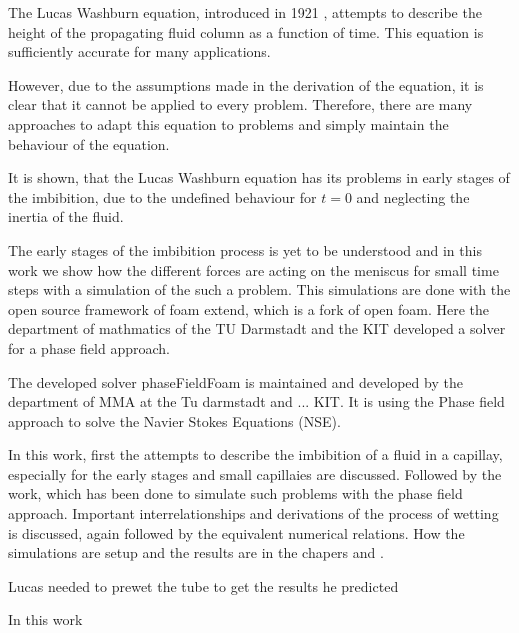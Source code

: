 The Lucas Washburn equation, introduced in 1921 \cite{lucas_ueber_1918, washburn_dynamics_1921}, attempts to describe the height of the propagating fluid column as a function of time. This equation is sufficiently accurate for many applications.   
  
However, due to the assumptions made in the derivation of the equation, it is clear that it cannot be applied to every problem. Therefore, there are many approaches to adapt this equation to problems and simply maintain the behaviour of the equation. 

It is shown, that the Lucas Washburn equation has its problems in early stages of the imbibition\cite{bosanquet_lv_1923, quere_inertial_1997}, due to the undefined behaviour for $t=0$ and neglecting the inertia of the fluid. 

The early stages of the imbibition process is yet to be understood and in this work we show how the different forces are acting on the meniscus for small time steps with a simulation of the such a problem. This simulations are done with the open source framework of foam extend, which is a fork of open foam. Here the department of mathmatics of the TU Darmstadt and the KIT developed a solver for a phase field approach. 

The developed solver phaseFieldFoam is maintained and developed by the department of MMA at the Tu darmstadt and ... KIT. It is using the Phase field approach to solve the Navier Stokes Equations (NSE).

In this work, first the attempts to describe the imbibition of a fluid in a capillay, especially for the early stages and small capillaies are discussed. Followed by the work, which has been done to simulate such problems with the phase field approach. Important interrelationships and derivations of the process of wetting is discussed, again followed by the equivalent numerical relations. How the simulations are setup and the results are in the chapers  and .  


Lucas needed to prewet the tube to get the results he predicted 

In this work 